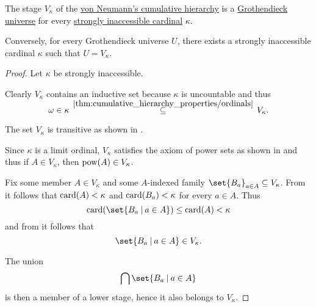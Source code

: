 \begin{theorem}\label{thm:grothendieck_universe_iff_strongly_inaccessible}
  The stage \( V_\kappa \) of the \hyperref[def:cumulative_hierarchy]{von Neumann's cumulative hierarchy} is a \hyperref[def:grothendieck_universe]{Grothendieck universe} for every \hyperref[def:regular_cardinal]{strongly inaccessible cardinal} \( \kappa \).

  Conversely, for every Grothendieck universe \( U \), there exists a strongly inaccessible cardinal \( \kappa \) such that \( U = V_\kappa \).
\end{theorem}
\begin{proof}
  \SufficiencySubProof Let \( \kappa \) be strongly inaccessible.

   Clearly \( V_\kappa \) contains an inductive set because \( \kappa \) is uncountable and thus
  \begin{equation*}
    \omega
    \in
    \kappa
    \reloset {\ref{thm:cumulative_hierarchy_properties/ordinals}} \subseteq
    V_\kappa.
  \end{equation*}

   The set \( V_\kappa \) is transitive as shown in .

   Since \( \kappa \) is a limit ordinal, \( V_\kappa \) satisfies the axiom of power sets as shown in  and thus if \( A \in V_\kappa \), then \( \operatorname{pow}(A) \in V_\kappa \).

   Fix some member \( A \in V_\kappa \) and some \( A \)-indexed family \( \set{ B_a }_{a \in A} \subseteq V_\kappa \). From  it follows that \( \operatorname{card}(A) < \kappa \) and \( \operatorname{card}(B_a) < \kappa \) for every \( a \in A \). Thus
  \begin{equation*}
    \card(\set{ B_a \given a \in A }) \leq \card(A) < \kappa
  \end{equation*}
  and from  it follows that
  \begin{equation*}
    \set{ B_a \given a \in A } \in V_\kappa.
  \end{equation*}

  The union
  \begin{equation*}
    \bigcap \set{ B_a \given a \in A }
  \end{equation*}
  is then a member of a lower stage, hence it also belongs to \( V_\kappa \).


\end{proof}
